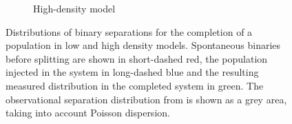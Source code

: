 \begin{figure}
\begin{subfigure}[b]{0.49\textwidth}
        \caption{High-density model}
        \label{Fig:5_completed_smaxis_HD}
    \end{subfigure}
\caption{Distributions of binary separations for the completion of a population in low and high density models. Spontaneous binaries before splitting are shown in short-dashed red, the population injected in the system in long-dashed blue and the resulting measured distribution in the completed system in green. The observational separation distribution from \protect\cite{raghavan2010} is shown as a grey area, taking into account Poisson dispersion.}
\label{Fig:5_completed_smaxis}
\end{figure}

